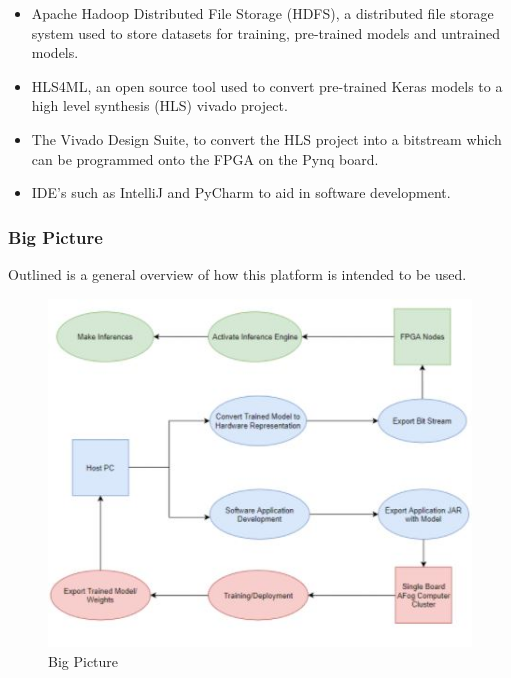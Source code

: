 \begin{itemize}
    \item Apache Hadoop Distributed File Storage (HDFS), a distributed file storage system used to store datasets for training, pre-trained models and untrained models.  
    
    \item HLS4ML, an open source tool used to convert pre-trained Keras models to a high level synthesis (HLS) vivado project. 
    
    \item The Vivado Design Suite, to convert the HLS project into a bitstream which can be programmed onto the FPGA on the Pynq board.  
    
    \item IDE’s such as IntelliJ and PyCharm to aid in software development.  
    
   
\end{itemize}

\subsubsection{Big Picture}

Outlined is a general overview of how this platform is intended to be used.  
    \begin{figure}[H]
          
      \includegraphics[scale=0.8]{images/BigPicture1.JPG}
      \caption{Big Picture}
              
    \end{figure}

%
%
%
